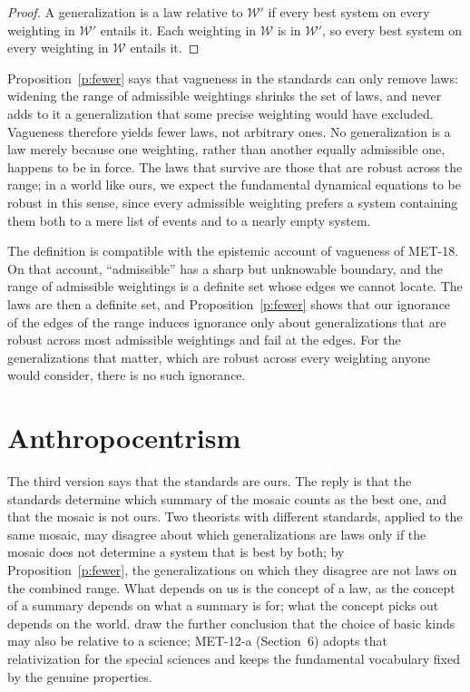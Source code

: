 \documentclass{situationist-preprint}
\begin{document}
\begin{proof}
A generalization is a law relative to $\mathcal{W}'$ if every best system on every weighting in $\mathcal{W}'$ entails it. Each weighting in $\mathcal{W}$ is in $\mathcal{W}'$, so every best system on every weighting in $\mathcal{W}$ entails it.
\end{proof}

Proposition~\ref{p:fewer} says that vagueness in the standards can only remove laws: widening the range of admissible weightings shrinks the set of laws, and never adds to it a generalization that some precise weighting would have excluded. Vagueness therefore yields fewer laws, not arbitrary ones. No generalization is a law merely because one weighting, rather than another equally admissible one, happens to be in force. The laws that survive are those that are robust across the range; in a world like ours, we expect the fundamental dynamical equations to be robust in this sense, since every admissible weighting prefers a system containing them both to a mere list of events and to a nearly empty system.

The definition is compatible with the epistemic account of vagueness of MET-18. On that account, \enquote{admissible} has a sharp but unknowable boundary, and the range of admissible weightings is a definite set whose edges we cannot locate. The laws are then a definite set, and Proposition~\ref{p:fewer} shows that our ignorance of the edges of the range induces ignorance only about generalizations that are robust across most admissible weightings and fail at the edges. For the generalizations that matter, which are robust across every weighting anyone would consider, there is no such ignorance.

\section{Anthropocentrism}

The third version says that the standards are ours. The reply is that the standards determine which summary of the mosaic counts as the best one, and that the mosaic is not ours. Two theorists with different standards, applied to the same mosaic, may disagree about which generalizations are laws only if the mosaic does not determine a system that is best by both; by Proposition~\ref{p:fewer}, the generalizations on which they disagree are not laws on the combined range. What depends on us is the concept of a law, as the concept of a summary depends on what a summary is for; what the concept picks out depends on the world. \citet{CohenCallender2009} draw the further conclusion that the choice of basic kinds may also be relative to a science; MET-12-a (Section~6) adopts that relativization for the special sciences and keeps the fundamental vocabulary fixed by the genuine properties.
\end{document}
